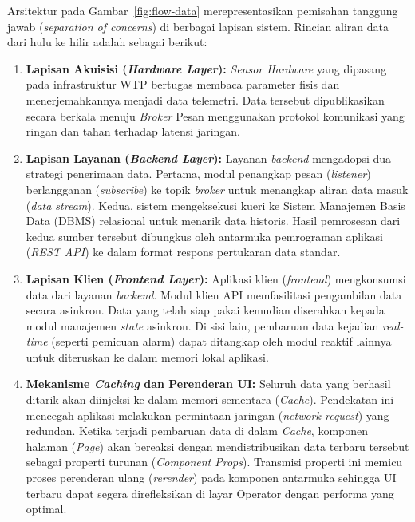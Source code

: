 Arsitektur pada Gambar~\ref{fig:flow-data} merepresentasikan pemisahan tanggung jawab (\textit{separation of concerns}) 
di berbagai lapisan sistem. Rincian aliran data dari hulu ke hilir adalah sebagai berikut:
\begin{enumerate}
    \item \textbf{Lapisan Akuisisi (\textit{Hardware Layer}):} \textit{Sensor Hardware} yang dipasang pada infrastruktur WTP 
    bertugas membaca parameter fisis dan menerjemahkannya menjadi data telemetri. Data tersebut dipublikasikan secara berkala 
    menuju \textit{Broker} Pesan menggunakan protokol komunikasi yang ringan dan tahan terhadap latensi jaringan.
    \item \textbf{Lapisan Layanan (\textit{Backend Layer}):} Layanan \textit{backend} mengadopsi 
    dua strategi penerimaan data. Pertama, modul penangkap pesan (\textit{listener}) berlangganan (\textit{subscribe}) ke topik \textit{broker} 
    untuk menangkap aliran data masuk (\textit{data stream}). Kedua, sistem mengeksekusi kueri ke Sistem Manajemen Basis Data (DBMS) relasional untuk menarik 
    data historis. Hasil pemrosesan dari kedua sumber tersebut dibungkus oleh antarmuka pemrograman aplikasi (\textit{REST API}) ke dalam format respons pertukaran data standar.
    \item \textbf{Lapisan Klien (\textit{Frontend Layer}):} Aplikasi klien (\textit{frontend}) 
    mengkonsumsi data dari layanan \textit{backend}. Modul klien API memfasilitasi pengambilan data secara asinkron. 
    Data yang telah siap pakai kemudian diserahkan kepada modul manajemen \textit{state} asinkron. Di sisi lain, 
    pembaruan data kejadian \textit{real-time} (seperti pemicuan alarm) dapat ditangkap oleh modul reaktif lainnya untuk diteruskan 
    ke dalam memori lokal aplikasi.
    \item \textbf{Mekanisme \textit{Caching} dan Perenderan UI:} Seluruh data yang berhasil ditarik akan diinjeksi ke dalam memori 
    sementara (\textit{Cache}). Pendekatan ini mencegah aplikasi melakukan permintaan jaringan (\textit{network request}) yang redundan. 
    Ketika terjadi pembaruan data di dalam \textit{Cache}, komponen halaman (\textit{Page}) akan bereaksi dengan mendistribusikan data 
    terbaru tersebut sebagai properti turunan (\textit{Component Props}). Transmisi properti ini memicu proses perenderan ulang (\textit{rerender}) 
    pada komponen antarmuka sehingga UI terbaru dapat segera direfleksikan di layar Operator dengan performa yang optimal.
\end{enumerate}

